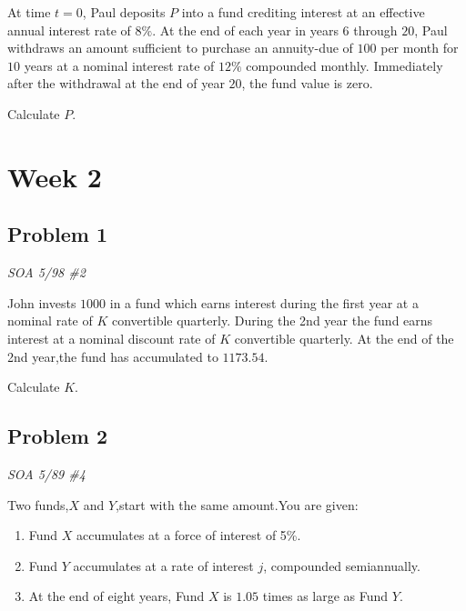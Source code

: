 \documentclass[
]{book}
\begin{document}
At time \(t=0\), Paul deposits \(P\) into a fund crediting interest at an effective annual interest rate of \(8\%\). At the end of each year in years \(6\) through \(20\), Paul withdraws an amount sufficient to purchase an annuity-due of \(100\) per month for \(10\) years at a nominal interest rate of \(12\%\) compounded monthly. Immediately after the withdrawal at the end of year \(20\), the fund value is zero.

Calculate \(P\).

\hypertarget{week-2}{%
\section*{Week 2}\label{week-2}}

\hypertarget{problem-1-2}{%
\subsection*{Problem 1}\label{problem-1-2}}

\emph{SOA 5/98 \#2}

John invests \(1000\) in a fund which earns interest during the first year at a nominal rate of \(K\) convertible quarterly. During the 2nd year the fund earns interest at a nominal discount rate of \(K\) convertible quarterly. At the end of the 2nd year,the fund has accumulated to \(1173.54\).

Calculate \(K\).

\hypertarget{problem-2-2}{%
\subsection*{Problem 2}\label{problem-2-2}}

\emph{SOA 5/89 \#4}

Two funds,\(X\) and \(Y\),start with the same amount.You are given:

\begin{enumerate}
\def\labelenumi{\arabic{enumi}.}
\item
  Fund \(X\) accumulates at a force of interest of 5\%.
\item
  Fund \(Y\) accumulates at a rate of interest \(j\), compounded semiannually.
\item
  At the end of eight years, Fund \(X\) is \(1.05\) times as large as Fund \(Y\).
\end{enumerate}
\end{document}
